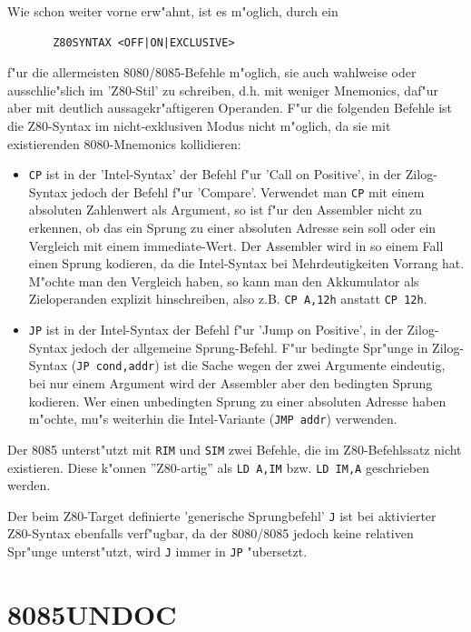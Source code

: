 \documentclass[12pt,a4paper,twoside]{report}
\newcommand{\tty}[1]{{\tt #1}}
\begin{document}
Wie schon weiter vorne erw"ahnt, ist es m"oglich, durch ein
\begin{verbatim}
       Z80SYNTAX <OFF|ON|EXCLUSIVE>
\end{verbatim}
f"ur die allermeisten 8080/8085-Befehle m"oglich, sie auch wahlweise
oder ausschlie"slich im 'Z80-Stil' zu schreiben, d.h. mit weniger
Mnemonics, daf"ur aber mit deutlich aussagekr"aftigeren Operanden.
F"ur die folgenden Befehle ist die Z80-Syntax im nicht-exklusiven Modus
nicht m"oglich, da sie mit existierenden 8080-Mnemonics kollidieren:
\begin{itemize}
\item{\tty{CP} ist in der 'Intel-Syntax' der Befehl f"ur 'Call on
      Positive', in der Zilog-Syntax jedoch der Befehl f"ur
      'Compare'.  Verwendet man \tty{CP} mit einem absoluten
      Zahlenwert als Argument, so ist f"ur den Assembler nicht zu
      erkennen, ob das ein Sprung zu einer absoluten Adresse sein
      soll oder ein Vergleich mit einem immediate-Wert.  Der
      Assembler wird in so einem Fall einen Sprung kodieren, da
      die Intel-Syntax bei Mehrdeutigkeiten Vorrang hat.  M"ochte
      man den Vergleich haben, so kann man den Akkumulator als
      Zieloperanden explizit hinschreiben, also z.B. \tty{CP A,12h}
      anstatt \tty{CP 12h}.}
\item{\tty{JP} ist in der Intel-Syntax der Befehl f"ur 'Jump on
      Positive', in der Zilog-Syntax jedoch der allgemeine
      Sprung-Befehl.  F"ur bedingte Spr"unge in Zilog-Syntax (\tty{JP
      cond,addr}) ist die Sache wegen der zwei Argumente eindeutig,
      bei nur einem Argument wird der Assembler aber den bedingten
      Sprung kodieren.  Wer einen unbedingten Sprung zu einer
      absoluten Adresse haben m"ochte, mu"s weiterhin die
      Intel-Variante (\tty{JMP addr}) verwenden.}
\end{itemize}
Der 8085 unterst"utzt mit \tty{RIM} und \tty{SIM} zwei Befehle, die
im Z80-Befehlssatz nicht existieren.  Diese k"onnen ''Z80-artig'' als
\tty{LD A,IM} bzw. \tty{LD IM,A} geschrieben werden.
\par
Der beim Z80-Target definierte 'generische Sprungbefehl' {\tt J} ist
bei aktivierter Z80-Syntax ebenfalls verf"ugbar, da der 8080/8085
jedoch keine relativen Spr"unge unterst"utzt, wird {\tt J} immer
in {\tt JP} "ubersetzt.


\section{8085UNDOC}
\label{8085Spec}
\end{document}
